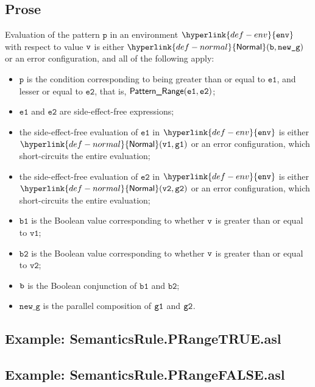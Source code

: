 \documentclass{book}
\newcommand\ProseOrError[0]{or an error configuration, which short-circuits the entire evaluation}
\newcommand\Normal[0]{\hyperlink{def-normal}{\textsf{Normal}}}
\newcommand\env[0]{\hyperlink{def-env}{\texttt{env}}}
\newcommand\newg[0]{\texttt{new\_g}}
\newcommand\vp[0]{\texttt{p}}
\newcommand\vvone[0]{\texttt{v1}}
\newcommand\vvtwo[0]{\texttt{v2}}
\newcommand\veone[0]{\texttt{e1}}
\newcommand\vetwo[0]{\texttt{e2}}
\newcommand\vbone[0]{\texttt{b1}}
\newcommand\vbtwo[0]{\texttt{b2}}
\begin{document}
    \subsection{Prose}
    Evaluation of the pattern $\vp$ in an environment $\env$ with
    respect to value $\texttt{v}$ is either $\Normal(\vb, \newg)$ or an error configuration,
    and all of the following apply:
    \begin{itemize}
      \item $\vp$ is the condition corresponding to being greater than or equal
        to $\veone$, and lesser or equal to $\vetwo$, that is, $\PatternRange(\veone, \vetwo)$;
      \item $\veone$ and $\vetwo$ are side-effect-free expressions;
      \item the side-effect-free evaluation of $\veone$ in $\env$ is either $\Normal(\vvone, \vgone)$ \ProseOrError;
      \item the side-effect-free evaluation of $\vetwo$ in $\env$ is either $\Normal(\vvtwo, \vgtwo)$ \ProseOrError;
      \item $\vbone$ is the Boolean value corresponding to whether
        $\texttt{v}$ is greater than or equal to $\vvone$;
        \item $\vbtwo$ is the Boolean value corresponding to whether
        $\texttt{v}$ is greater than or equal to $\vvtwo$;
      \item $\texttt{b}$ is the Boolean conjunction of $\vbone$ and
      $\vbtwo$;
      \item $\newg$ is the parallel composition of $\texttt{g1}$ and $\texttt{g2}$.
    \end{itemize}

    \subsection{Example: SemanticsRule.PRangeTRUE.asl}

    \subsection{Example: SemanticsRule.PRangeFALSE.asl}


\end{document}

